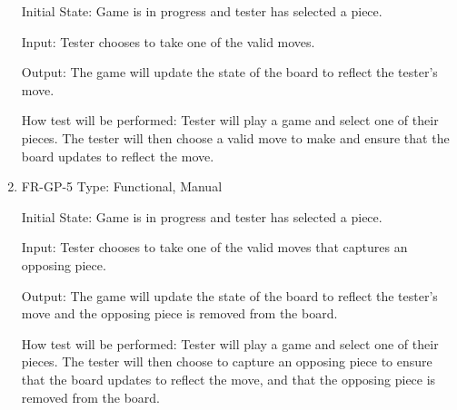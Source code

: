 \documentclass[12pt, titlepage]{article}
\begin{document}
\begin{enumerate}
    Initial State: Game is in progress and tester has selected a piece.
    					
    Input: Tester chooses to take one of the valid moves.
    					
    Output: The game will update the state of the board to reflect the tester's move.
    					
    How test will be performed: Tester will play a game and select one of their pieces. The tester will then choose a valid move to make and ensure that the board updates to reflect the move.
    \item{FR-GP-5} 
    Type: Functional, Manual
    
    Initial State: Game is in progress and tester has selected a piece.
    					
    Input: Tester chooses to take one of the valid moves that captures an opposing piece.
    					
    Output: The game will update the state of the board to reflect the tester's move and the opposing piece is removed from the board.
    					
    How test will be performed: Tester will play a game and select one of their pieces. The tester will then choose to capture an opposing piece to ensure that the board updates to reflect the move, and that the opposing piece is removed from the board.
\end{enumerate}
\end{document}
